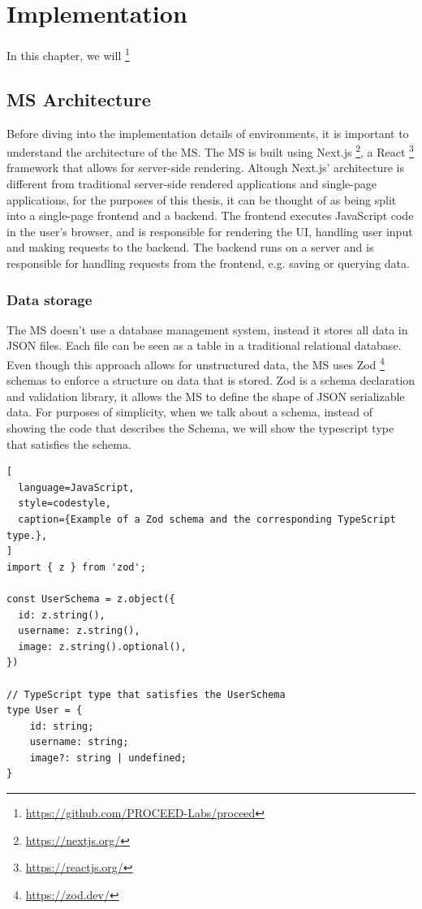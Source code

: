 \chapter{Implementation}
\label{cha:implementation}

In this chapter, we will
\footnote{\url{https://github.com/PROCEED-Labs/proceed}}

\section {MS Architecture}
\label{cha:ms-architecture}

Before diving into the implementation details of environments, it is important to
understand the architecture of the MS.
The MS is built using Next.js \footnote{\url{https://nextjs.org/}}, a React \footnote{\url{https://reactjs.org/}}
framework that allows for server-side rendering.
Altough Next.js' architecture is different from traditional server-side rendered
applications and single-page applications,
for the purposes of this thesis,
it can be thought of as being split into a single-page frontend and a backend.
The frontend executes JavaScript code in the user's browser, and is
responsible for rendering the UI, handling user input and making requests to the backend.
The backend runs on a server and is responsible for handling requests from the frontend,
e.g. saving or querying data.

\subsection{Data storage}
\label{cha:ms-architecture:data-storage}


The MS doesn't use a database management system, instead it stores all data in JSON files.
Each file can be seen as a table in a traditional relational database.
Even though this approach allows for unstructured data, the MS uses 
Zod \footnote{\url{https://zod.dev/}} schemas to enforce a structure on
data that is stored.
Zod is a schema declaration and validation library, it allows the MS to define the shape
of JSON serializable data.
For purposes of simplicity, when we talk about a schema, instead of showing the code that
describes the Schema, we will show the typescript type that satisfies the schema.

\begin{lstlisting}[
  language=JavaScript,
  style=codestyle,
  caption={Example of a Zod schema and the corresponding TypeScript type.},
]
import { z } from 'zod';

const UserSchema = z.object({
  id: z.string(),
  username: z.string(),
  image: z.string().optional(),
})

// TypeScript type that satisfies the UserSchema
type User = {
    id: string;
    username: string;
    image?: string | undefined;
}
\end{lstlisting}

